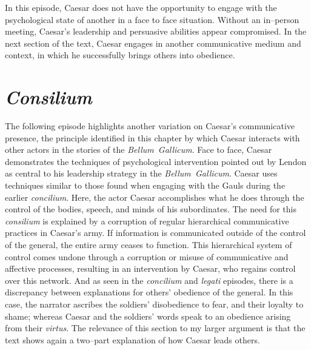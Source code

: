 \documentclass[12pt,letterpaper,oneside,final]{memoir}
\begin{document}
In this episode, Caesar does not have the opportunity to engage with the psychological state of another in a face to face situation. Without an in--person meeting, Caesar's leadership and persuasive abilities appear compromised. In the next section of the text, Caesar engages in another communicative medium and context, in which he successfully brings others into obedience.

\section{\emph{Consilium}}
\label{bg-consilium}
The following episode highlights another variation on Caesar's communicative presence, the principle identified in this chapter by which Caesar interacts with other actors in the stories of the \emph{Bellum~Gallicum}. Face to face, Caesar demonstrates the techniques of psychological intervention pointed out by Lendon as central to his leadership strategy in the \emph{Bellum~Gallicum}. Caesar uses techniques similar to those found when engaging with the Gauls during the earlier \emph{concilium}. Here, the actor Caesar accomplishes what he does through the control of the bodies, speech, and minds of his subordinates. The need for this \emph{consilium} is explained by a corruption of regular hierarchical communicative practices in Caesar's army. If information is communicated outside of the control of the general, the entire army ceases to function. This hierarchical system of control comes undone through a corruption or misuse of communicative and affective processes, resulting in an intervention by Caesar, who regains control over this network. And as seen in the \emph{concilium} and \emph{legati} episodes, there is a discrepancy between explanations for others' obedience of the general. In this case, the narrator ascribes the soldiers' disobedience to fear, and their loyalty to shame; whereas Caesar and the soldiers' words speak to an obedience arising from their \emph{virtus}. The relevance of this section to my larger argument is that the text shows again a two--part explanation of how Caesar leads others.
\end{document}
